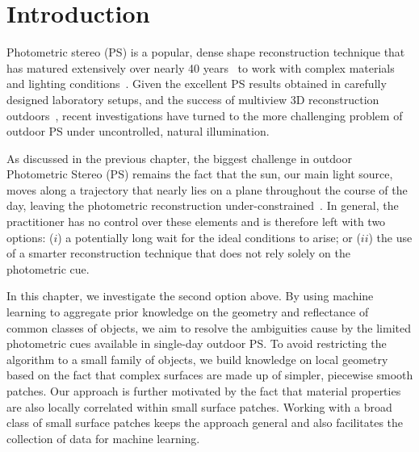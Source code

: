 \section{Introduction}

Photometric stereo (PS) is a popular, dense shape reconstruction technique that has matured extensively over nearly 40 years~\cite{woodham-opteng-80} to work with complex materials and lighting conditions~\cite{alldrin-cvpr-08,basri-ijcv-07,johnson-cvpr-11,oxholm-eccv-12}. Given the excellent PS results obtained in carefully designed laboratory setups, and the success of multiview 3D reconstruction outdoors~\cite{snavely-ijcv-08}, recent investigations have turned to the more challenging problem of outdoor PS under uncontrolled, natural illumination.

As discussed in the previous chapter, the biggest challenge in outdoor Photometric Stereo (PS) remains the fact that the sun, our main light source, moves along a trajectory that nearly lies on a plane throughout the course of the day, leaving the photometric reconstruction under-constrained~\cite{woodham-opteng-80}.
In general, the practitioner has no control over these elements and is therefore left with two options: ($i$) a potentially long wait for the ideal conditions to arise; or ($ii$) the use of a smarter reconstruction technique that does not rely solely on the photometric cue.

In this chapter, we investigate the second option above. By using machine learning to aggregate prior knowledge on the geometry and reflectance of common classes of objects, we aim to resolve the ambiguities cause by the limited photometric cues available in single-day outdoor PS. To avoid restricting the algorithm to a small family of objects, we build knowledge on local geometry based on the fact that complex surfaces are made up of simpler, piecewise smooth patches. Our approach is further motivated by the fact that material properties are also locally correlated within small surface patches. Working with a broad class of small surface patches keeps the approach general and also facilitates the collection of data for machine learning.

